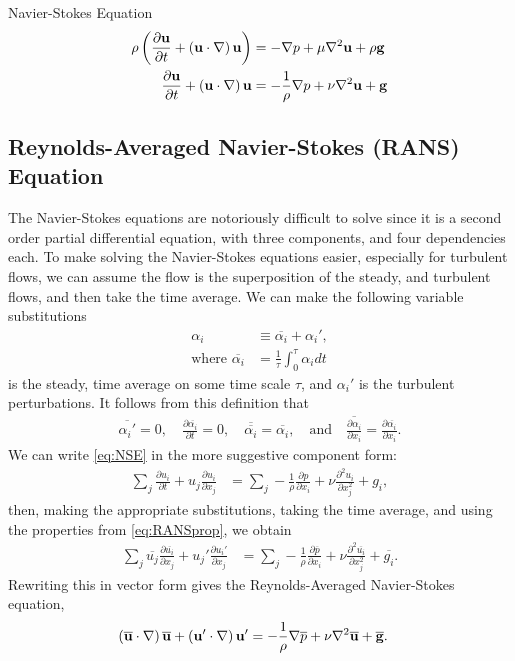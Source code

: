 \documentclass[10pt, titlepage]{article}
\begin{document}
Navier-Stokes Equation
\begin{align}
\rho \left( \frac{\partial \bf{u}}{\partial t} + \left( \bf{u} \cdot \nabla \right) \bf{u} \right) &= - \nabla p + \mu \nabla^2 \bf{u} + \rho \bf{g} \nonumber \\
\frac{\partial \bf{u}}{\partial t} + \left( \bf{u} \cdot \nabla \right) \bf{u} &= - \frac{1}{\rho} \nabla p + \nu \nabla^2 \bf{u} + \bf{g} \label{eq:NSE}
\end{align}

\subsection{Reynolds-Averaged Navier-Stokes (RANS) Equation}
The Navier-Stokes equations are notoriously difficult to solve since it is a second order partial differential equation, with three components, and four dependencies each. To make solving the Navier-Stokes equations easier, especially for turbulent flows, we can assume the flow is the superposition of the steady, and turbulent flows, and then take the time average. We can make the following variable substitutions
\begin{align*}
\alpha_i &\equiv \overline{\alpha_i} + \alpha_i', \\
\text{where } \overline{\alpha_i} &= \frac{1}{\tau} \int_0^\tau \alpha_i dt
\end{align*}
is the steady, time average on some time scale $\tau$, and $\alpha_i'$ is the turbulent perturbations. It follows from this definition that
\begin{align}
\overline{\alpha_i'} = 0, \quad \frac{\partial \overline{\alpha_i}}{\partial t} = 0, \quad \overline{\overline{\alpha_i}} = \overline{\alpha_i}, \quad \text{and} \quad \overline{\frac{\partial \alpha_i}{\partial x_i}} =  \frac{\partial \overline{\alpha_i}}{\partial x_i}. \label{eq:RANSprop}
\end{align}
We can write \eqref{eq:NSE} in the more suggestive component form:
\begin{align*}
\sum_j \frac{\partial u_i}{\partial t} + u_j \frac{\partial u_i}{\partial x_j} &= \sum_j  -\frac{1}{\rho} \frac{\partial p}{\partial x_i} + \nu \frac{\partial^2 u_i}{\partial x_j^2} + g_i,
\end{align*}
then, making the appropriate substitutions, taking the time average, and using the properties from  \eqref{eq:RANSprop}, we obtain
\begin{align*}
\sum_j \overline{u_j} \frac{\partial \overline{u_i}}{\partial x_j} + u_j' \frac{\partial u_i'}{\partial x_j} &= \sum_j  -\frac{1}{\rho} \frac{\partial \overline{p}}{\partial x_i} + \nu \frac{\partial^2 \overline{u_i}}{\partial x_j^2} + \overline{g_i}.
\end{align*}
Rewriting this in vector form gives the Reynolds-Averaged Navier-Stokes equation,
\begin{align}
\left( \bf{\overline{u}} \cdot \nabla \right) \bf{\overline{u}} + \left( \bf{u'} \cdot \nabla \right) \bf{u'}&= - \frac{1}{\rho} \nabla \overline{p} + \nu \nabla^2 \bf{\overline{u}} + \bf{\overline{g}}. \label{eq:RANS}
\end{align}
\end{document}
